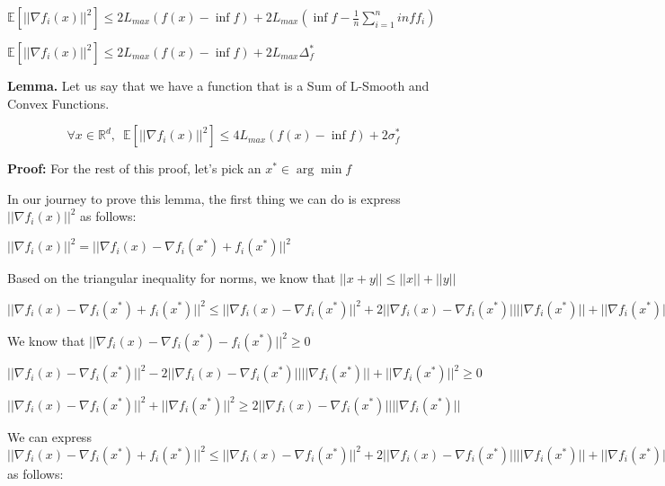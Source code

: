 $ \mathbb{E} [||\nabla f_i(x)||^2] \leq  2L_{max} (f(x) - \inf f) + 2L_{max} (\inf f - \frac{1}{n} \sum_{i=1}^{n} inf f_i)$ \newline

$ \mathbb{E} [||\nabla f_i(x)||^2] \leq  2L_{max} (f(x) - \inf f) + 2L_{max} \Delta_f^*$ \newline


\noindent \textbf{Lemma. } Let us say that we have a function that is a Sum of L-Smooth and Convex Functions. 

\begin{equation}
\forall x \in \mathbb{R}^d, \enspace \mathbb{E}[||\nabla f_i(x)||^2] \leq 4L_{max} (f(x) - \inf f) + 2\sigma^*_f
\end{equation}

\noindent \textbf{Proof: } \newline 
For the rest of this proof, let's pick an $x^* \in \arg \min f$

In our journey to prove this lemma, the first thing we can do is express $||\nabla f_i(x)||^2$ as follows: \newline 

$||\nabla f_i(x)||^2 = ||\nabla f_i(x) - \nabla f_i(x^*) + f_i(x^*)||^2$ \newline 

Based on the triangular inequality for norms, we know that $||x + y|| \leq ||x|| + ||y||$ \newline 

$||\nabla f_i(x) - \nabla f_i(x^*) + f_i(x^*)||^2 \leq ||\nabla f_i(x) - \nabla f_i(x^*)||^2 + 2 ||\nabla f_i(x) - \nabla f_i(x^*)|| ||\nabla f_i(x^*)|| + ||\nabla f_i(x^*)||^2$ \newline 

We know that $||\nabla f_i(x) - \nabla f_i(x^*) - f_i(x^*)||^2 \geq 0$ \newline 

$||\nabla f_i(x) - \nabla f_i(x^*)||^2 - 2 ||\nabla f_i(x) - \nabla f_i(x^*)|| ||\nabla f_i(x^*)|| + ||\nabla f_i(x^*)||^2 \geq 0$ \newline 

$||\nabla f_i(x) - \nabla f_i(x^*)||^2  + ||\nabla f_i(x^*)||^2 \geq 2 ||\nabla f_i(x) - \nabla f_i(x^*)|| ||\nabla f_i(x^*)||$ \newline 

We can express $||\nabla f_i(x) - \nabla f_i(x^*) + f_i(x^*)||^2 \leq ||\nabla f_i(x) - \nabla f_i(x^*)||^2 + 2 ||\nabla f_i(x) - \nabla f_i(x^*)|| ||\nabla f_i(x^*)|| + ||\nabla f_i(x^*)||^2$  as follows: \newline 

